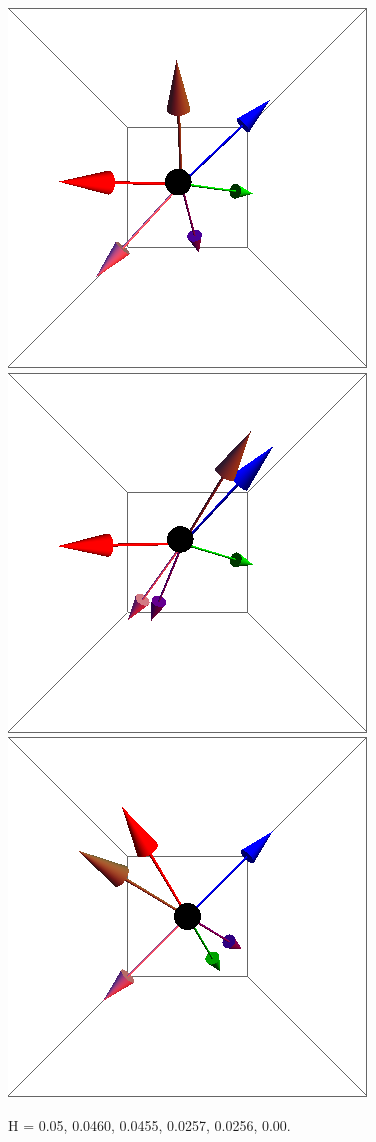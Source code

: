 \documentclass{article}
\begin{document}
\begin{figure}[ht]
\includegraphics[scale=0.23]{100/244S005to000R.png}
\includegraphics[scale=0.23]{100/245S005to000R.png}
\includegraphics[scale=0.23]{100/501S005to000R.png}
\caption{H = 0.05, 0.0460, 0.0455, 0.0257, 0.0256, 0.00.}
\end{figure}
\clearpage
\end{document}
